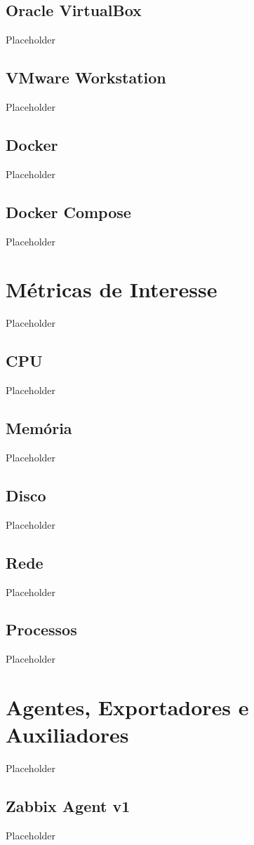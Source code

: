 \subsection{Oracle VirtualBox}
Placeholder

\subsection{VMware Workstation}
Placeholder

\subsection{Docker}
Placeholder

\subsection{Docker Compose}
Placeholder

\section{Métricas de Interesse}
Placeholder

\subsection{CPU}
Placeholder
\subsection{Memória}
Placeholder
\subsection{Disco}
Placeholder
\subsection{Rede}
Placeholder
\subsection{Processos}
Placeholder

\section{Agentes, Exportadores e Auxiliadores}
Placeholder

\subsection{Zabbix Agent v1}
Placeholder

